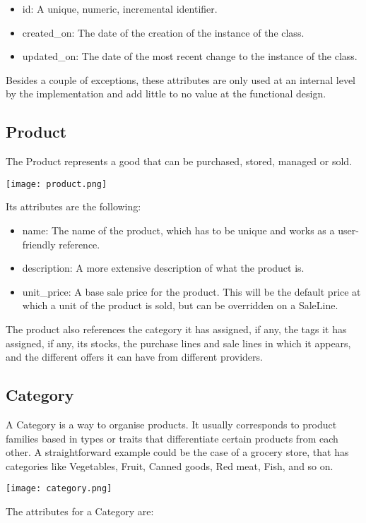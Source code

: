 \begin{itemize}
\item id: A unique, numeric, incremental identifier.
\item created\_on: The date of the creation of the instance of the class.
\item updated\_on: The date of the most recent change to the instance of the class.
\end{itemize}

Besides a couple of exceptions, these attributes are only used at an internal level by the implementation and add little to no value at the functional design.

\subsection{Product}
The Product represents a good that can be purchased, stored, managed or sold. 
\begin{center}
\texttt{[image: product.png]}
\end{center}
Its attributes are the following:

\begin{itemize}
\item name: The name of the product, which has to be unique and works as a user-friendly reference.
\item description: A more extensive description of what the product is.
\item unit\_price: A base sale price for the product. This will be the default price at which a unit of the product is sold, but can be overridden on a SaleLine.
\end{itemize}

The product also references the category it has assigned, if any, the tags it has assigned, if any, its stocks, the purchase lines and sale lines in which it appears, and the different offers it can have from different providers.

\subsection{Category}
A Category is a way to organise products. It usually corresponds to product families based in types or traits that differentiate certain products from each other. A straightforward example could be the case of a grocery store, that has categories like Vegetables, Fruit, Canned goods, Red meat, Fish, and so on. 
\begin{center}
\texttt{[image: category.png]}
\end{center}
The attributes for a Category are:


